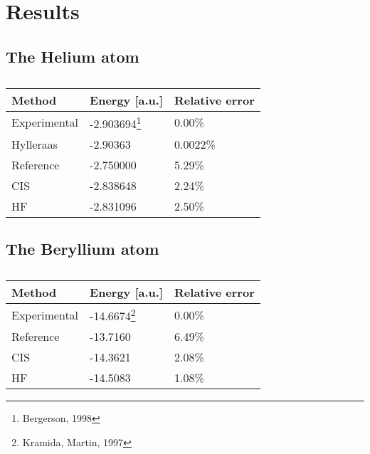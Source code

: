 \section{Results} \label{sec:results}


\subsection{The Helium atom}
\begin{table} [H]
	\caption{}
	\begin{tabularx}{\textwidth}{X|X|X} \hline\hline
		\textbf{Method}&\textbf{Energy} [a.u.]&\textbf{Relative error}\\ \hline
		Experimental & -2.903694\footnote{Bergerson, 1998} & 0.00\%  \\
		Hylleraas & -2.90363 & 0.0022\% \\
		Reference & -2.750000 & 5.29\% \\
		CIS & -2.838648 &  2.24\% \\
		HF & -2.831096 & 2.50\% \\ \hline\hline
	\end{tabularx}
\end{table}

\subsection{The Beryllium atom}

\begin{table} [H]
	\caption{}
	\begin{tabularx}{\textwidth}{X|X|X} \hline\hline
		\textbf{Method}&\textbf{Energy} [a.u.]&\textbf{Relative error}\\ \hline
		Experimental & -14.6674\footnote{Kramida, Martin, 1997} & 0.00\%  \\
		Reference & -13.7160 & 6.49\% \\
		CIS & -14.3621 &  2.08\% \\
		HF & -14.5083 & 1.08\% \\ \hline\hline
	\end{tabularx}
\end{table}

\iffalse
\begin{figure} [H]%
	\centering
	\subfloat[Lambda vs. R2-score]{{\texttt{[image: ../plots/lambda\_R2score.png]} }}%
	\subfloat[Variance vs. R2-score]{{\texttt{[image: ../plots/var\_R2score.png]} }}
	\caption{R$^2$-score plotted as a function of the penalty $\lambda$ (a) and as a function of the noise (b). $\lambda\in[10^{-8},10^2]$ in (a) and $\sigma^2\in[10^{-6},10^{-0.7}]$ in (b). The other parameters used were $\lambda=1e-5$ (penalty, was held constant for (b) only), $\eta=1e-4$ (learning rate), $niter=1e5$ (number of iterations) and $\mathcal{N}(0, \sigma^2=0.1)$ (noise, was held constant for (a) only).}%
	\label{fig:R2_scores}
\end{figure}
\fi 



